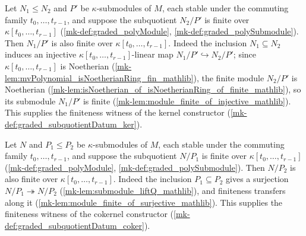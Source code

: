 \begin{lemma}\label{mk-lem:graded_polyQuot_finite_of_le_numerator}
  \leanok

  Let \(N_1 \le N_2\) and \(P'\) be \(\kappa\)-submodules of \(M\), each stable under
  the commuting family \(t_0, \dots, t_{r-1}\), and suppose the subquotient
  \(N_2/P'\) is finite over \(\kappa[t_0, \dots, t_{r-1}]\)
  (\ref{mk-def:graded_polyModule}, \ref{mk-def:graded_polySubmodule}). Then \(N_1/P'\) is
  also finite over \(\kappa[t_0, \dots, t_{r-1}]\). Indeed the inclusion
  \(N_1 \subseteq N_2\) induces an injective \(\kappa[t_0, \dots, t_{r-1}]\)-linear
  map \(N_1/P' \hookrightarrow N_2/P'\); since
  \(\kappa[t_0, \dots, t_{r-1}]\) is Noetherian
  (\ref{mk-lem:mvPolynomial_isNoetherianRing_fin_mathlib}), the finite module
  \(N_2/P'\) is Noetherian
  (\ref{mk-lem:isNoetherian_of_isNoetherianRing_of_finite_mathlib}), so its submodule
  \(N_1/P'\) is finite (\ref{mk-lem:module_finite_of_injective_mathlib}). This supplies
  the finiteness witness of the kernel constructor
  (\ref{mk-def:graded_subquotientDatum_ker}).
\end{lemma}

\begin{lemma}\label{mk-lem:graded_polyQuot_finite_of_le_denominator}
  \leanok

  Let \(N\) and \(P_1 \le P_2\) be \(\kappa\)-submodules of \(M\), each stable under
  the commuting family \(t_0, \dots, t_{r-1}\), and suppose the subquotient
  \(N/P_1\) is finite over \(\kappa[t_0, \dots, t_{r-1}]\)
  (\ref{mk-def:graded_polyModule}, \ref{mk-def:graded_polySubmodule}). Then \(N/P_2\) is
  also finite over \(\kappa[t_0, \dots, t_{r-1}]\). Indeed the inclusion
  \(P_1 \subseteq P_2\) gives a surjection \(N/P_1 \twoheadrightarrow N/P_2\)
  (\ref{mk-lem:submodule_liftQ_mathlib}), and finiteness transfers along it
  (\ref{mk-lem:module_finite_of_surjective_mathlib}). This supplies the
  finiteness witness of the cokernel constructor
  (\ref{mk-def:graded_subquotientDatum_coker}).
\end{lemma}

